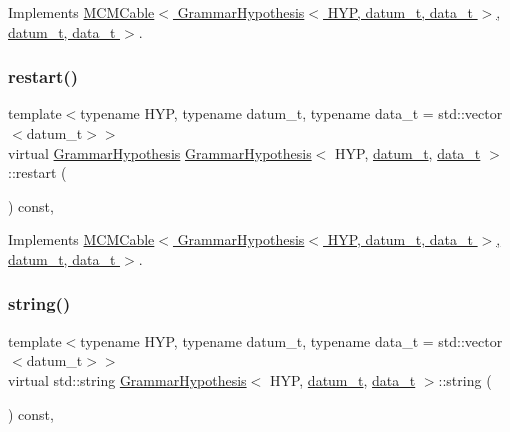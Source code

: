 Implements \hyperlink{class_m_c_m_cable_ab119a14256ab92c5c1e941f8492df830}{M\+C\+M\+Cable$<$ Grammar\+Hypothesis$<$ H\+Y\+P, datum\+\_\+t, data\+\_\+t $>$, datum\+\_\+t, data\+\_\+t $>$}.

\mbox{\label{class_grammar_hypothesis_aa0d96def3fe7e22a2bbf2c89ba996bcf}} 
\subsubsection{\texorpdfstring{restart()}{restart()}}
{\footnotesize\ttfamily template$<$typename H\+YP, typename datum\+\_\+t, typename data\+\_\+t = std\+::vector$<$datum\+\_\+t$>$$>$ \\
virtual \hyperlink{class_grammar_hypothesis}{Grammar\+Hypothesis} \hyperlink{class_grammar_hypothesis}{Grammar\+Hypothesis}$<$ H\+YP, \hyperlink{class_bayesable_a9f1a6c0cd7855550fa10b1a8f13a5867}{datum\+\_\+t}, \hyperlink{class_bayesable_aa2788c4d7718c0a824e1d28c4c98f921}{data\+\_\+t} $>$\+::restart (\begin{DoxyParamCaption}{ }\end{DoxyParamCaption}) const\hspace{0.3cm}{\ttfamily [inline]}, {\ttfamily [virtual]}}



Implements \hyperlink{class_m_c_m_cable_a220d6c4ca73e20441c14fa5bd3e090d3}{M\+C\+M\+Cable$<$ Grammar\+Hypothesis$<$ H\+Y\+P, datum\+\_\+t, data\+\_\+t $>$, datum\+\_\+t, data\+\_\+t $>$}.

\mbox{\label{class_grammar_hypothesis_a55ee98de75a30cea35fdaf62ccf14a90}} 
\subsubsection{\texorpdfstring{string()}{string()}}
{\footnotesize\ttfamily template$<$typename H\+YP, typename datum\+\_\+t, typename data\+\_\+t = std\+::vector$<$datum\+\_\+t$>$$>$ \\
virtual std\+::string \hyperlink{class_grammar_hypothesis}{Grammar\+Hypothesis}$<$ H\+YP, \hyperlink{class_bayesable_a9f1a6c0cd7855550fa10b1a8f13a5867}{datum\+\_\+t}, \hyperlink{class_bayesable_aa2788c4d7718c0a824e1d28c4c98f921}{data\+\_\+t} $>$\+::string (\begin{DoxyParamCaption}{ }\end{DoxyParamCaption}) const\hspace{0.3cm}{\ttfamily [inline]}, {\ttfamily [virtual]}}



